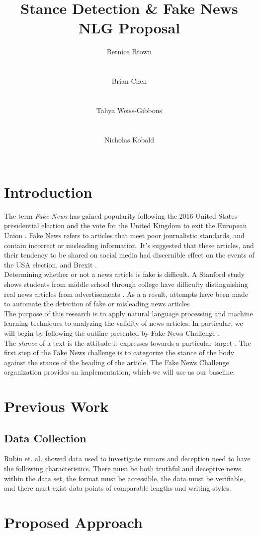 \documentclass[11pt,a4paper]{article}
\title{Stance Detection \& Fake News \\ NLG Proposal}
\author{
  Bernice Brown \\
					  \\
					  \\\And
  Brian Chen 	      \\
					  \\
					  \\\And
  Tahya Weiss-Gibbons \\
					  \\
					  \\\And
  Nicholas Kobald \\  \\
}
\date{}
\begin{document}
\maketitle
\section{Introduction}
The term \emph{Fake News} has gained popularity following the 2016 United States presidential election and the vote for the United Kingdom to exit the European Union \cite{rose2017brexit}\cite{kucharski2016post}. Fake News refers to articles that meet poor journalistic standards, and contain incorrect or misleading information. It's suggested that these articles, and their tendency to be shared on social media had discernible effect on the events of the USA election, and Brexit \cite{allcott2017social}. \\


Determining whether or not a news article is fake is difficult.  A Stanford study shows students from middle school through college have difficulty distinguishing real news articles from advertisements \cite{wineburg2016evaluating}. As a a result, attempts have been made to automate the detection of fake or misleading news articles \cite{conroy2015automatic}\\

The purpose of this research is to apply natural language processing and machine learning techniques to analyzing the validity of news articles. In particular, we will begin by following the outline presented by Fake News Challenge \cite{fakenewschallenge}. \\

The \emph{stance} of a text is the attitude it expresses towards a particular target \cite{augenstein2016stance}. The first step of the Fake News challenge is to categorize the stance of the body against the stance of the heading of the article. The Fake News Challenge organization provides an implementation, which we will use as our baseline. 


\section{Previous Work}

\subsection{Data Collection}
Rubin et. al. showed data used to investigate rumors and deception need to have the following characteristics. There must be both truthful and deceptive news within the data set, the format must be accessible, the data must be verifiable, and there must exist data points of comparable lengths and writing styles\cite{Rubin}. \\

\cite{conroy2015automatic}

\section{Proposed Approach}


%
%


\end{document}
